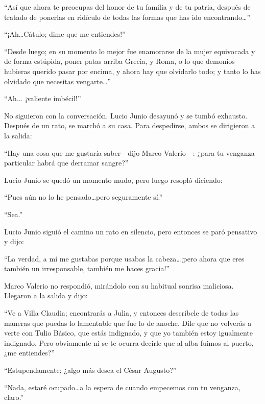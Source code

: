\documentclass[11pt,openany]{book}
\begin{document}
“Así que ahora te preocupas del honor de tu familia y de tu patria, después de tratado de ponerlas en ridículo de todas las formas que has ido encontrando\dots” 

“¡Ah\dots Cátulo; dime que me entiendes!” 

“Desde luego; en su momento lo mejor fue enamorarse de la mujer equivocada y de forma estúpida, poner patas arriba Grecia, y Roma, o lo que demonios hubieras querido pasar por encima, y ahora hay que olvidarlo todo; y tanto lo has olvidado que necesitas vengarte\dots” 

“Ah... ¡valiente imbécil!” 

No siguieron con la conversación. Lucio Junio desayunó y se tumbó exhausto. Después de un rato, se marchó a su casa. Para despedirse, ambos se dirigieron a la salida: 

“Hay una cosa que me gustaría saber—dijo Marco Valerio—: ¿para tu venganza particular habrá que derramar sangre?” 

Lucio Junio se quedó un momento mudo, pero luego resopló diciendo: 

“Pues aún no lo he pensado\dots pero seguramente sí.” 

“Sea.” 

Lucio Junio siguió el camino un rato en silencio, pero entonces se paró pensativo y dijo: 

“La verdad, a mí me gustabas porque usabas la cabeza\dots ¡pero ahora que eres también un irresponsable, también me haces gracia!” 

Marco Valerio no respondió, mirándolo con su habitual sonrisa maliciosa. Llegaron a la salida y dijo: 

“Ve a Villa Claudia; encontrarás a Julia, y entonces descríbele de todas las maneras que puedas lo lamentable que fue lo de anoche. Dile que no volverás a verte con Tulio Básico, que estás indignado, y que yo también estoy igualmente indignado. Pero obviamente ni se te ocurra decirle que al alba fuimos al puerto, ¿me entiendes?” 

“Estupendamente; ¿algo más desea el César Augusto?” 

“Nada, estaré ocupado\dots a la espera de cuando empecemos con tu venganza, claro.” 
\end{document}
